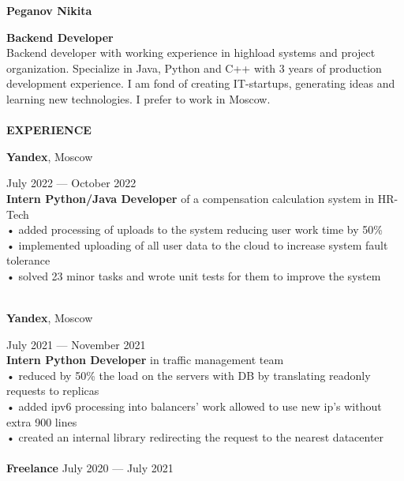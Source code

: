 \documentclass{article}
\begin{document}
\begin{vwcol}[widths={0.8,0.2},
 sep=.8cm, justify=flush,rule=0pt,indent=1em] 
\begin{spacing}{1.1}
\noindent\textbf{\Huge{Peganov Nikita}}\\
\end{spacing}
\noindent\textcolor[rgb]{0.1255,0.2902,0.7843}{\textbf{\Large{Backend Developer}}}\\
Backend developer with working experience in highload systems and project organization. Specialize in Java, Python and C++ with 3 years of production development experience. I am fond of creating IT-startups, generating ideas and learning new technologies. I prefer to work in Moscow.\\
\\
\noindent\textcolor[rgb]{0.1255,0.2902,0.7843}{\textbf{\Large{EXPERIENCE}}}\\
\begin{Large}
\textbf{Yandex}, Moscow
\end{Large}
\hspace{200pt}July 2022 — October 2022\\
\textbf{Intern Python/Java Developer} of a compensation calculation system in HR-Tech\\
• added processing of uploads to the system reducing user work time by 50\%\\
• implemented uploading of all user data to the cloud to increase system fault tolerance\\
• solved 23 minor tasks and wrote unit tests for them to improve the system\\
\\
\begin{Large}
\textbf{Yandex}, Moscow
\end{Large}
\hspace{190pt}July 2021 — November 2021\\
\textbf{Intern Python Developer} in traffic management team\\
• reduced by 50\% the load on the servers with DB by translating readonly requests to replicas\\
• added ipv6 processing into balancers’ work allowed to use new ip’s without extra 900 lines\\
• created an internal library redirecting the request to the nearest datacenter\\
\\
\textbf{\Large{Freelance}}
\hspace{260pt}July 2020 — July 2021\\ 

\end{vwcol}
\end{document}

